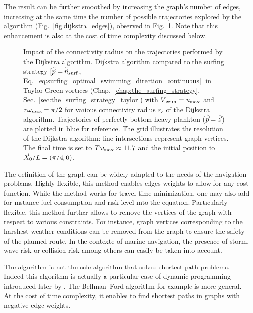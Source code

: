 The result can be further smoothed by increasing the graph's number of edges, increasing at the same time the number of possible trajectories explored by the algorithm (Fig.~\ref{fig:dijkstra_edges}), observed in Fig.~\ref{fig:taylor_green_vortex_dijkstra_connectivity}.
Note that this enhancement is also at the cost of time complexity discussed below.
\begin{figure}%
	\centering
	
	\caption[Impact of the connectivity radius on the trajectories performed by the Dijkstra algorithm.]{
		Impact of the connectivity radius on the trajectories performed by the Dijkstra algorithm.
		Dijkstra algorithm compared to the surfing strategy [$\hat{\vec{p}} = \hat{\vec{n}}_{\mathrm{surf}}$, Eq.~\eqref{eq:surfing_optimal_swimming_direction_continuous}] in Taylor-Green vortices (Chap.~\ref{chap:the_surfing_strategy}, Sec.~\ref{sec:the_surfing_strategy_taylor}) with $V_{\mathrm{swim}} = u_{\max}$ and $\tau \omega_{\max} = \pi/2$ for various connectivity radius $r_c$ of the Dijkstra algorithm.
		Trajectories of perfectly bottom-heavy plankton ($\hat{\vec{p}} = \hat{\vec{z}}$) are plotted in blue for reference.
		The grid illustrates the resolution of the Dijkstra algorithm: line intersections represent graph vertices.
		The  final time is set to $T \omega_{\max} \approx 11.7$ and the initial position to $\vec{X}_0/L = (\pi/4, 0)$.
	}
	\label{fig:taylor_green_vortex_dijkstra_connectivity}
\end{figure}

The definition of the graph can be widely adapted to the needs of the navigation problems. 
Highly flexible, this method enables edges weights to allow for any cost function.
While the method works for travel time minimization, one may also add for instance fuel consumption and risk level into the equation.
Particularly flexible, this method further allows to remove the vertices of the graph with respect to various constraints.
For instance, graph vertices corresponding to the harshest weather conditions can be removed from the graph to ensure the safety of the planned route.
In the contexte of marine navigation, the presence of storm, wave risk or collision risk among others can easily be taken into account.

The \citet{dijkstra1959note} algorithm is not the sole algorithm that solves shortest path problems.
Indeed this algorithm is actually a particular case of dynamic programming introduced later by \citet{bellman1966dynamic}.
The Bellman–Ford algorithm \citep{ford1956network, bellman1958routing} for example is more general.
At the cost of time complexity, it enables to find shortest paths in graphs with negative edge weights.

